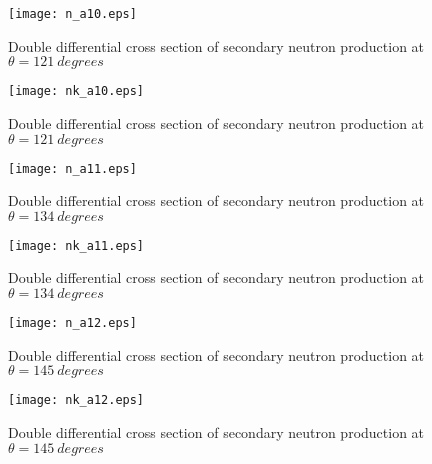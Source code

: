 \documentclass[12pt]{article}
\begin{document}
\begin{figure}[htbp]
\caption{Double differential cross section of secondary neutron production at $\theta = 121~degrees$}
\label{figa10} 
\centerline{\texttt{[image: n\_a10.eps]}}
\end{figure}

\begin{figure}[htbp]
\caption{Double differential cross section of secondary neutron production at $\theta = 121~degrees$}
\label{figa10a} 
\centerline{\texttt{[image: nk\_a10.eps]}}
\end{figure}

\begin{figure}[htbp]
\caption{Double differential cross section of secondary neutron production at $\theta = 134~degrees$}
\label{figa11} 
\centerline{\texttt{[image: n\_a11.eps]}}
\end{figure}

\begin{figure}[htbp]
\caption{Double differential cross section of secondary neutron production at $\theta = 134~degrees$}
\label{figa11a} 
\centerline{\texttt{[image: nk\_a11.eps]}}
\end{figure}

\begin{figure}[htbp]
\caption{Double differential cross section of secondary neutron production at $\theta = 145~degrees$}
\label{figa12} 
\centerline{\texttt{[image: n\_a12.eps]}}
\end{figure}

\begin{figure}[htbp]
\caption{Double differential cross section of secondary neutron production at $\theta = 145~degrees$}
\label{figa12a} 
\centerline{\texttt{[image: nk\_a12.eps]}}
\end{figure}
\end{document}
